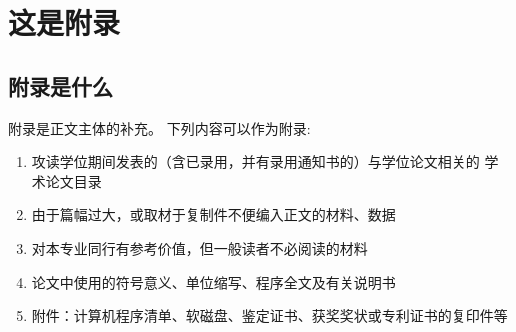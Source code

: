 

\chapter{这是附录}


\section{附录是什么}
\Verbatiminput{}
附录是正文主体的补充。
下列内容可以作为附录:
\begin{enumerate}
\item 攻读学位期间发表的（含已录用，并有录用通知书的）与学位论文相关的
	学术论文目录
\item 由于篇幅过大，或取材于复制件不便编入正文的材料、数据
\item 对本专业同行有参考价值，但一般读者不必阅读的材料
\item 论文中使用的符号意义、单位缩写、程序全文及有关说明书
\item 附件：计算机程序清单、软磁盘、鉴定证书、获奖奖状或专利证书的复印件等
\end{enumerate}
